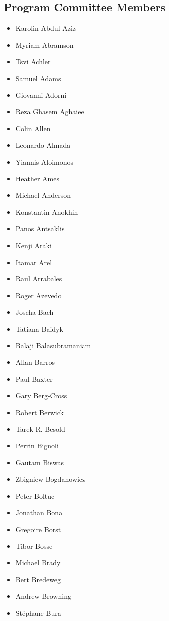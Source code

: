\documentclass[10pt,fleqn,openany]{book} %
\begin{document}
\subsection{Program Committee Members}
	\begin{multicols}{2}
		\begin{itemize}
			\item Karolin Abdul-Aziz
			\item Myriam Abramson
			\item Tsvi Achler
			\item Samuel Adams
			\item Giovanni Adorni
			\item Reza Ghasem Aghaiee
			\item Colin Allen
			\item Leonardo Almada
			\item Yiannis Aloimonos
			\item Heather Ames
			\item Michael Anderson
			\item Konstantin Anokhin
			\item Panos Antsaklis
			\item Kenji Araki
			\item Itamar Arel
			\item Raul Arrabales
			\item Roger Azevedo
			\item Joscha Bach
			\item Tatiana Baidyk
			\item Balaji Balasubramaniam
			\item Allan Barros
			\item Paul Baxter
			\item Gary Berg-Cross
			\item Robert Berwick
			\item Tarek R. Besold
			\item Perrin Bignoli
			\item Gautam Biswas
			\item Zbigniew Bogdanowicz
			\item Peter Boltuc
			\item Jonathan Bona
			\item Gregoire Borst
			\item Tibor Bosse
			\item Michael Brady
			\item Bert Bredeweg
			\item Andrew Browning
			\item Stéphane Bura

\end{itemize}
\end{multicols}
\end{document}
